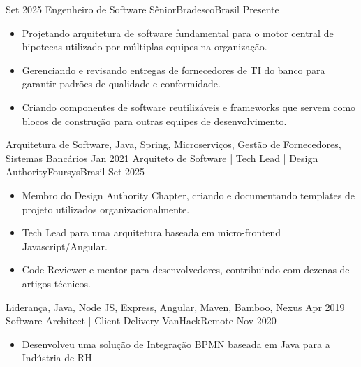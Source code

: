 %
%
%
\begin{experiences}
  \experience
    {Set 2025}   {Engenheiro de Software Sênior}{Bradesco}{Brasil}
    {Presente} {
                      \begin{itemize}
                        \item Projetando arquitetura de software fundamental para o motor central de hipotecas utilizado por múltiplas equipes na organização.
                        \item Gerenciando e revisando entregas de fornecedores de TI do banco para garantir padrões de qualidade e conformidade.
                        \item Criando componentes de software reutilizáveis e frameworks que servem como blocos de construção para outras equipes de desenvolvimento.                          
                      \end{itemize}
                    }
                    {Arquitetura de Software, Java, Spring, Microserviços, Gestão de Fornecedores, Sistemas Bancários}
  \emptySeparator
  \experience
    {Jan 2021}   {Arquiteto de Software | Tech Lead | Design Authority}{Foursys}{Brasil}
    {Set 2025} {
                      \begin{itemize}
                        \item Membro do Design Authority Chapter, criando e documentando templates de projeto utilizados organizacionalmente.
                        \item Tech Lead para uma arquitetura baseada em micro-frontend Javascript/Angular.
                        \item Code Reviewer e mentor para desenvolvedores, contribuindo com dezenas de artigos técnicos.                          
                      \end{itemize}
                    }
                    {Liderança, Java, Node JS, Express, Angular, Maven, Bamboo, Nexus}
  \emptySeparator
  \experience
    {Apr 2019} {Software Architect | Client Delivery }{VanHack}{Remote}
    {Nov 2020}    {
                      \begin{itemize}
                        \item Desenvolveu uma solução de Integração BPMN baseada em Java para a Indústria de RH         

\end{itemize}}
\end{experiences}
